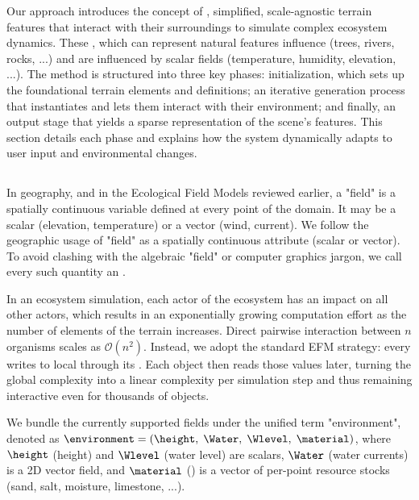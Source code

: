 Our approach introduces the concept of , simplified, scale-agnostic terrain features that interact with their surroundings to simulate complex ecosystem dynamics. These , which can represent natural features influence (trees, rivers, rocks, ...) and are influenced by scalar fields (temperature, humidity, elevation, ...). The method is structured into three key phases: initialization, which sets up the foundational terrain elements and  definitions; an iterative generation process that instantiates  and lets them interact with their environment; and finally, an output stage that yields a sparse representation of the scene's features. This section details each phase and explains how the system dynamically adapts to user input and environmental changes.

\subsection{}
\label{sec:env-obj-communication}

In geography, and in the Ecological Field Models reviewed earlier, a "field" is a spatially continuous variable defined at every point of the domain.
It may be a scalar (elevation, temperature) or a vector (wind, current). We follow the geographic usage of "field" as a spatially continuous attribute (scalar or vector). To avoid clashing with the algebraic "field" or computer graphics jargon, we call every such quantity an .

In an ecosystem simulation, each actor of the ecosystem has an impact on all other actors, which results in an exponentially growing computation effort as the number of elements of the terrain increases. Direct pairwise interaction between $n$ organisms scales as $\mathcal{O}(n^{2})$.
Instead, we adopt the standard EFM strategy: every  writes to local  through its .
Each object then reads those values later, turning the global complexity into a linear complexity per simulation step and thus remaining interactive even for thousands of objects.

We bundle the currently supported fields under the unified term "environment", denoted as $\environment = (\height, \; \Water, \; \Wlevel, \; \material)$,
where $\height$ (height) and $\Wlevel$ (water level) are scalars, $\Water$ (water currents) is a 2D vector field, and $\material$ () is a vector of per-point resource stocks (sand, salt, moisture, limestone, ...).

